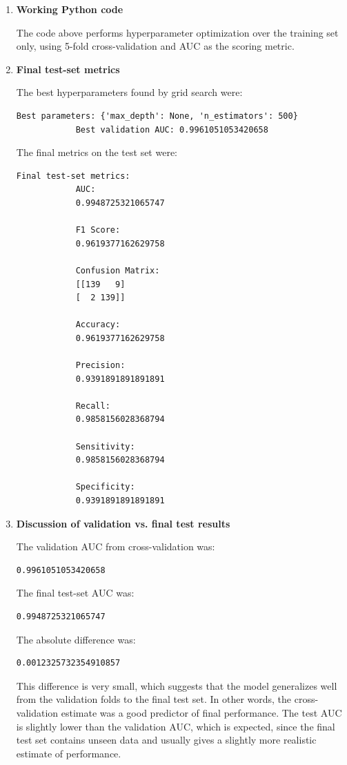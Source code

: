\documentclass[11pt]{article}
\begin{document}
	\begin{enumerate}[label=\roman*.]
		
		\item \textbf{Working Python code}
		
		The code above performs hyperparameter optimization over the training set only, using 5-fold cross-validation and AUC as the scoring metric.
		
		\item \textbf{Final test-set metrics}
		
		The best hyperparameters found by grid search were:
		\begin{lstlisting}[style=matlabstyle]
			Best parameters: {'max_depth': None, 'n_estimators': 500}
			Best validation AUC: 0.9961051053420658
		\end{lstlisting}
		
		The final metrics on the test set were:
		\begin{lstlisting}[style=matlabstyle]
			Final test-set metrics:
			AUC:
			0.9948725321065747
			
			F1 Score:
			0.9619377162629758
			
			Confusion Matrix:
			[[139   9]
			[  2 139]]
			
			Accuracy:
			0.9619377162629758
			
			Precision:
			0.9391891891891891
			
			Recall:
			0.9858156028368794
			
			Sensitivity:
			0.9858156028368794
			
			Specificity:
			0.9391891891891891
		\end{lstlisting}
		
		\item \textbf{Discussion of validation vs. final test results}
		
		The validation AUC from cross-validation was:
		\begin{lstlisting}[style=matlabstyle]
			0.9961051053420658
		\end{lstlisting}
		
		The final test-set AUC was:
		\begin{lstlisting}[style=matlabstyle]
			0.9948725321065747
		\end{lstlisting}
		
		The absolute difference was:
		\begin{lstlisting}[style=matlabstyle]
			0.0012325732354910857
		\end{lstlisting}
		
		This difference is very small, which suggests that the model generalizes well from the validation folds to the final test set. In other words, the cross-validation estimate was a good predictor of final performance. The test AUC is slightly lower than the validation AUC, which is expected, since the final test set contains unseen data and usually gives a slightly more realistic estimate of performance.
		
	\end{enumerate}
	
\end{document}
